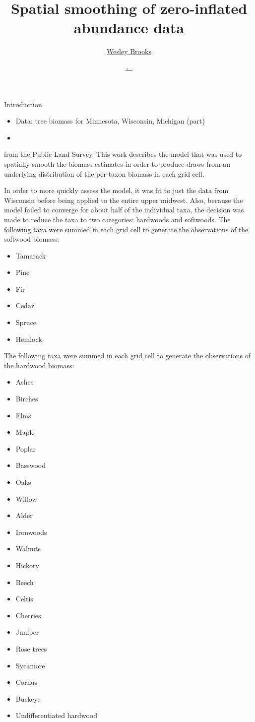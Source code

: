 \documentclass[12pt,t]{beamer}
\title{Spatial smoothing of zero-inflated abundance data}
\author{\href{http://www.somesquares.org}{Wesley Brooks}}
\institute{\href{http://www.stat.wisc.edu}{Department of Statistics} \\[2pt] \href{http://www.wisc.edu}{University of Wisconsin{\textendash}Madison}}
\date{\href{http://www.somesquares.org}{\tt \scriptsize . }}
\begin{document}
{
}

\begin{frame}{Introduction}
\begin{itemize}
  \item Data: tree biomass for Minnesota, Wisconsin, Michigan (part)
  \item 
\end{itemize}

from the Public Land Survey. This work describes the model that was used to spatially smooth the biomass estimates in order to produce draws from an underlying distribution of the per-taxon biomass in each grid cell.

In order to more quickly assess the model, it was fit to just the data from Wisconsin before being applied to the entire upper midwest. Also, because the model failed to converge for about half of the individual taxa, the decision was made to reduce the taxa to two categories: hardwoods and softwoods. The following taxa were summed in each grid cell to generate the observations of the softwood biomass:
\begin{itemize}
 \item Tamarack
 \item Pine
 \item Fir
 \item Cedar
 \item Spruce
 \item Hemlock
\end{itemize}

The following taxa were summed in each grid cell to generate the observations of the hardwood biomass:
\begin{itemize}
 \item Ashes
 \item Birches
 \item Elms
 \item Maple
 \item Poplar
 \item Basswood
 \item Oaks
 \item Willow
 \item Alder
 \item Ironwoods
 \item Walnuts
 \item Hickory
 \item Beech
 \item Celtis
 \item Cherries
 \item Juniper
 \item Rose trees
 \item Sycamore
 \item Cornus
 \item Buckeye
 \item Undifferentiated hardwood
\end{itemize}
\end{frame}
\end{document}
